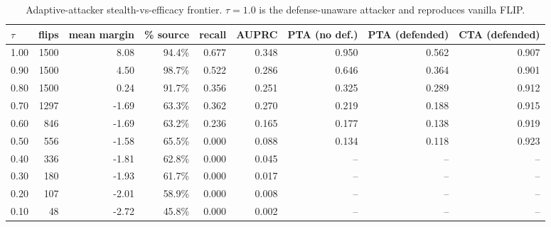 \begin{table}[t]
\centering
\small
\begin{tabular}{lrrrrrrrr}
\toprule
$\tau$ & flips & mean margin & \% source & recall & AUPRC & PTA (no def.) & PTA (defended) & CTA (defended) \\
\midrule
1.00 & 1500 & 8.08 & 94.4\% & 0.677 & 0.348 & 0.950 & 0.562 & 0.907 \\
0.90 & 1500 & 4.50 & 98.7\% & 0.522 & 0.286 & 0.646 & 0.364 & 0.901 \\
0.80 & 1500 & 0.24 & 91.7\% & 0.356 & 0.251 & 0.325 & 0.289 & 0.912 \\
0.70 & 1297 & -1.69 & 63.3\% & 0.362 & 0.270 & 0.219 & 0.188 & 0.915 \\
0.60 & 846 & -1.69 & 63.2\% & 0.236 & 0.165 & 0.177 & 0.138 & 0.919 \\
0.50 & 556 & -1.58 & 65.5\% & 0.000 & 0.088 & 0.134 & 0.118 & 0.923 \\
0.40 & 336 & -1.81 & 62.8\% & 0.000 & 0.045 & -- & -- & -- \\
0.30 & 180 & -1.93 & 61.7\% & 0.000 & 0.017 & -- & -- & -- \\
0.20 & 107 & -2.01 & 58.9\% & 0.000 & 0.008 & -- & -- & -- \\
0.10 & 48 & -2.72 & 45.8\% & 0.000 & 0.002 & -- & -- & -- \\
\bottomrule
\end{tabular}
\caption{Adaptive-attacker stealth-vs-efficacy frontier. $\tau=1.0$ is the defense-unaware attacker and reproduces vanilla FLIP.}
\label{tab:frontier}
\end{table}

